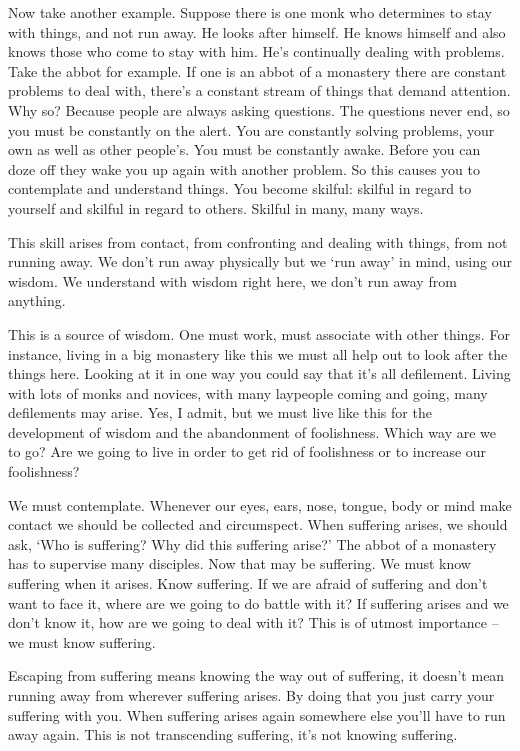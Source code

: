 Now take another example. Suppose there is one monk who determines to stay with things, and not run away. He looks after himself. He knows himself and also knows those who come to stay with him. He's continually dealing with problems. Take the abbot for example. If one is an abbot of a monastery there are constant problems to deal with, there's a constant stream of things that demand attention. Why so? Because people are always asking questions. The questions never end, so you must be constantly on the alert. You are constantly solving problems, your own as well as other people's. You must be constantly awake. Before you can doze off they wake you up again with another problem. So this causes you to contemplate and understand things. You become skilful: skilful in regard to yourself and skilful in regard to others. Skilful in many, many ways. 

This skill arises from contact, from confronting and dealing with things, from not running away. We don't run away physically but we `run away' in mind, using our wisdom. We understand with wisdom right here, we don't run away from anything. 

This is a source of wisdom. One must work, must associate with other things. For instance, living in a big monastery like this we must all help out to look after the things here. Looking at it in one way you could say that it's all defilement. Living with lots of monks and novices, with many laypeople coming and going, many defilements may arise. Yes, I admit, but we must live like this for the development of wisdom and the abandonment of foolishness. Which way are we to go? Are we going to live in order to get rid of foolishness or to increase our foolishness? 

We must contemplate. Whenever our eyes, ears, nose, tongue, body or mind make contact we should be collected and circumspect. When suffering arises, we should ask, `Who is suffering? Why did this suffering arise?' The abbot of a monastery has to supervise many disciples. Now that may be suffering. We must know suffering when it arises. Know suffering. If we are afraid of suffering and don't want to face it, where are we going to do battle with it? If suffering arises and we don't know it, how are we going to deal with it? This is of utmost importance -- we must know suffering.

 Escaping from suffering means knowing the way out of suffering, it doesn't mean running away from wherever suffering arises. By doing that you just carry your suffering with you. When suffering arises again somewhere else you'll have to run away again. This is not transcending suffering, it's not knowing suffering. 

